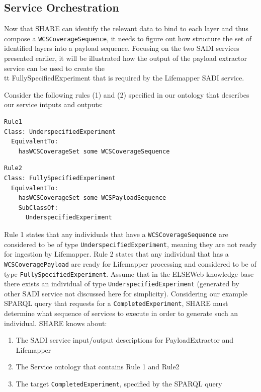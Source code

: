 \documentclass[letterpaper]{article}
\begin{document}
\subsection{Service Orchestration}
Now that SHARE can identify the relevant data to bind to each layer and thus compose a {\tt WCSCoverageSequence}, it needs to figure out how structure the set of identified layers into a payload sequence. Focusing on the two SADI services presented earlier, it will be illustrated how the output of the payload extractor service can be used to create the {\\tt FullySpecifiedExperiment} that is required by the Lifemapper SADI service.
 
Consider the following rules (1) and (2) specified in our ontology that describes our service intputs and outputs:

\begin{lstlisting}[basicstyle=\footnotesize]
Rule1
Class: UnderspecifiedExperiment
  EquivalentTo: 
    hasWCSCoverageSet some WCSCoverageSequence
\end{lstlisting}

\begin{lstlisting}[basicstyle=\footnotesize]
Rule2
Class: FullySpecifiedExperiment
  EquivalentTo: 
    hasWCSCoverageSet some WCSPayloadSequence
    SubClassOf:
      UnderspecifiedExperiment
\end{lstlisting}

Rule 1 states that any individuals that have a {\tt WCSCoverageSequence} are considered to be of type {\tt UnderspecifiedExperiment}, meaning they are not ready for ingestion by Lifemapper. Rule 2 states that any individual that has a {\tt WCSCoveragePayload} are ready for Lifemapper processing and considered to be of type {\tt FullySpecifiedExperiment}. Assume that in the ELSEWeb knowledge base there exists an individual of type {\tt UnderspecifiedExperiment} (generated by other SADI service not discussed here for simplicity). Considering our example SPARQL query that requests for a {\tt CompletedExperiment}, SHARE must determine what sequence of services to execute in order to generate such an individual. SHARE knows about:

\begin{enumerate}
\item The SADI service input/output descriptions for PayloadExtractor and Lifemapper
\item The Service ontology that contains Rule 1 and Rule2
\item The target {\tt CompletedExperiment}, specified by the SPARQL query
\end{enumerate}
 
\end{document}
